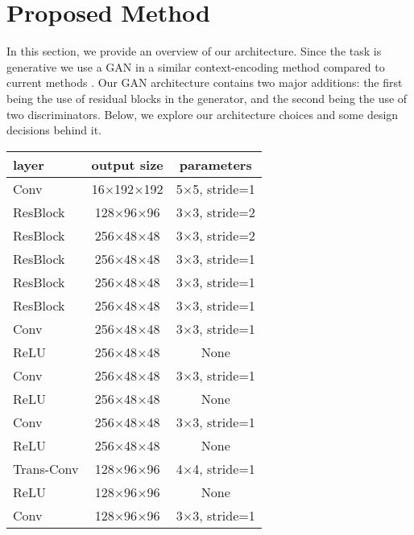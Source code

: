 \documentclass{article}
\begin{document}
\section{Proposed Method}
In this section, we provide an overview of our architecture. Since the task is generative we use a GAN in a similar context-encoding method compared to current methods \citep{van_hoorick_image_2020}\citep{pathak_context_2016}. Our GAN architecture contains two major additions: the first being the use of residual blocks in the generator, and the second being the use of two discriminators. Below, we explore our architecture choices and some design decisions behind it.

\begin{table}[h] 
  \centering  
    \begin{tabular}{lcc}  
    \hline
    \textbf{layer} & \textbf{output size} & \textbf{parameters}\\ 
    \hline \hline
      Conv & 16$\times$192$\times$192 & 5$\times$5, stride=1 \\
    \hline
      ResBlock & 128$\times$96$\times$96 & 3$\times$3, stride=2 \\
    \hline
      ResBlock & 256$\times$48$\times$48 & 3$\times$3, stride=2 \\
    \hline
      ResBlock & 256$\times$48$\times$48 & 3$\times$3, stride=1 \\
    \hline
      ResBlock & 256$\times$48$\times$48 & 3$\times$3, stride=1 \\
    \hline
      ResBlock & 256$\times$48$\times$48 & 3$\times$3, stride=1 \\
    \hline
      Conv & 256$\times$48$\times$48 & 3$\times$3, stride=1 \\
    \hline
      ReLU & 256$\times$48$\times$48 & None \\
    \hline
      Conv & 256$\times$48$\times$48 & 3$\times$3, stride=1 \\
    \hline
      ReLU & 256$\times$48$\times$48 & None \\
    \hline
      Conv & 256$\times$48$\times$48 & 3$\times$3, stride=1 \\
    \hline
      ReLU & 256$\times$48$\times$48 & None \\
    \hline
      Trans-Conv & 128$\times$96$\times$96 & 4$\times$4, stride=1 \\
    \hline
      ReLU & 128$\times$96$\times$96 & None \\
    \hline
      Conv & 128$\times$96$\times$96 & 3$\times$3, stride=1 \\

\end{tabular}
\end{table}
\end{document}
